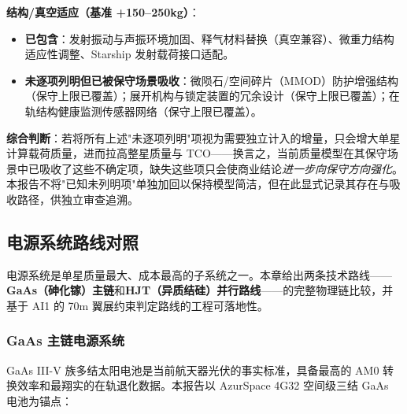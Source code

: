 \noindent\textbf{结构/真空适应（基准 +150--250\;kg）}：
\begin{itemize}[leftmargin=*]
    \item \textbf{已包含}：发射振动与声振环境加固、释气材料替换（真空兼容）、微重力结构适应性调整、Starship 发射载荷接口适配。
    \item \textbf{未逐项列明但已被保守场景吸收}：微陨石/空间碎片（MMOD）防护增强结构（保守上限已覆盖）；展开机构与锁定装置的冗余设计（保守上限已覆盖）；在轨结构健康监测传感器网络（保守上限已覆盖）。
\end{itemize}

\noindent\textbf{综合判断}：若将所有上述"未逐项列明"项视为需要独立计入的增量，只会增大单星计算载荷质量，进而拉高整星质量与 TCO——换言之，当前质量模型在其保守场景中已吸收了这些不确定项，缺失这些项只会使商业结论\emph{进一步向保守方向强化}。本报告不将"已知未列明项"单独加回以保持模型简洁，但在此显式记录其存在与吸收路径，供独立审查追溯。

\subsection{电源系统路线对照}

电源系统是单星质量最大、成本最高的子系统之一。本章给出两条技术路线——\textbf{GaAs（砷化镓）主链}和\textbf{HJT（异质结硅）并行路线}——的完整物理链比较，并基于 AI1 的 70\;m 翼展约束判定路线的工程可落地性。

\subsubsection{GaAs 主链电源系统}

GaAs III-V 族多结太阳电池是当前航天器光伏的事实标准，具备最高的 AM0 转换效率和最翔实的在轨退化数据。本报告以 AzurSpace 4G32 空间级三结 GaAs 电池为锚点：

